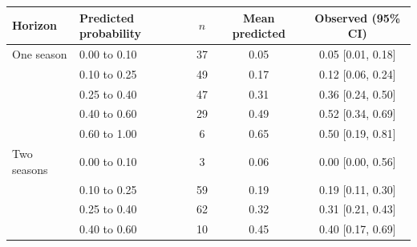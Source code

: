 \begin{tabular}{llccc}
\toprule
Horizon & Predicted probability & $n$ & Mean predicted & Observed (95\% CI) \\
\midrule
One season & 0.00 to 0.10 & 37 & 0.05 & 0.05 [0.01, 0.18] \\
 & 0.10 to 0.25 & 49 & 0.17 & 0.12 [0.06, 0.24] \\
 & 0.25 to 0.40 & 47 & 0.31 & 0.36 [0.24, 0.50] \\
 & 0.40 to 0.60 & 29 & 0.49 & 0.52 [0.34, 0.69] \\
 & 0.60 to 1.00 & 6 & 0.65 & 0.50 [0.19, 0.81] \\
\addlinespace
Two seasons & 0.00 to 0.10 & 3 & 0.06 & 0.00 [0.00, 0.56] \\
 & 0.10 to 0.25 & 59 & 0.19 & 0.19 [0.11, 0.30] \\
 & 0.25 to 0.40 & 62 & 0.32 & 0.31 [0.21, 0.43] \\
 & 0.40 to 0.60 & 10 & 0.45 & 0.40 [0.17, 0.69] \\
\bottomrule
\end{tabular}
